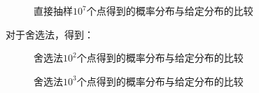 \documentclass[a4paper,11pt]{article}
\begin{document}
\begin{figure}[!htbp]        
\caption{\label{1} 直接抽样$10^{7}$个点得到的概率分布与给定分布的比较}      
\end{figure}

\newpage 对于舍选法，得到：

\begin{figure}[!htbp]        
\caption{\label{1} 舍选法$10^{2}$个点得到的概率分布与给定分布的比较}      
\end{figure}

\begin{figure}[!htbp]        
\caption{\label{1} 舍选法$10^{3}$个点得到的概率分布与给定分布的比较}      
\end{figure}
\end{document}

